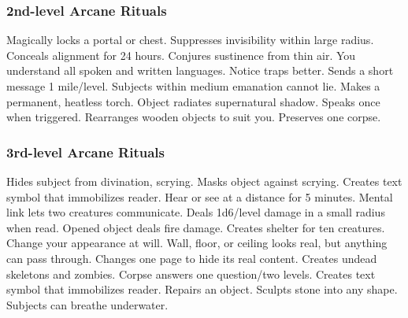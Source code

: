 \subsubsection{2nd-level Arcane Rituals}
\begin{rituallist}
     Magically locks a portal or chest.
     Suppresses invisibility within large radius.
     Conceals alignment for 24 hours.
     Conjures sustinence from thin air.
     You understand all spoken and written languages.
     Notice traps better.
     Sends a short message 1 mile/level.
     Subjects within medium emanation cannot lie.
     Makes a permanent, heatless torch.
     Object radiates supernatural shadow.
     Speaks once when triggered.
     Rearranges wooden objects to suit you.
     Preserves one corpse.
\end{rituallist}

\subsubsection{3rd-level Arcane Rituals}
\begin{rituallist}
     Hides subject from divination, scrying.
     Masks object against scrying.
     Creates text symbol that immobilizes reader.
     Hear or see at a distance for 5 minutes.
     Mental link lets two creatures communicate.
     Deals 1d6/level damage in a small radius when read.
     Opened object deals fire damage.
     Creates shelter for ten creatures.
     Change your appearance at will.
     Wall, floor, or ceiling looks real, but anything can pass through.
     Changes one page to hide its real content.
     Creates undead skeletons and zombies.
     Corpse answers one question/two levels.
     Creates text symbol that immobilizes reader.
     Repairs an object.
     Sculpts stone into any shape.
     Subjects can breathe underwater.
\end{rituallist}

